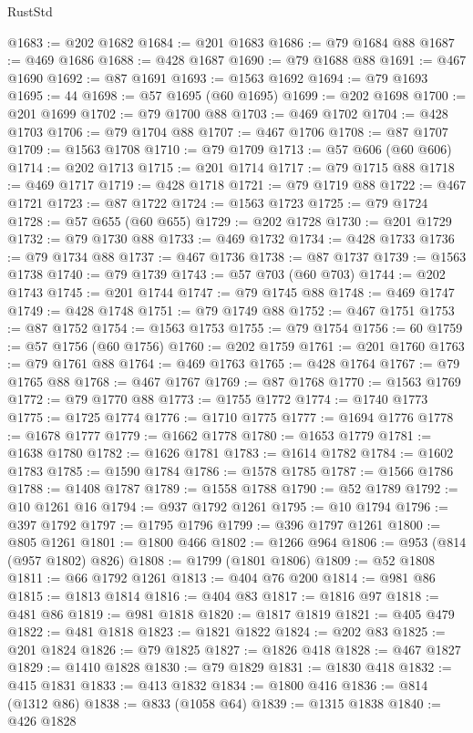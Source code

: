 \begin{lexlean}{RustStd}
\begin{coremodule}
@1683 := @202 @1682
@1684 := @201 @1683
@1686 := @79 @1684 @88
@1687 := @469 @1686
@1688 := @428 @1687
@1690 := @79 @1688 @88
@1691 := @467 @1690
@1692 := @87 @1691
@1693 := @1563 @1692
@1694 := @79 @1693
@1695 := 44
@1698 := @57 @1695 (@60 @1695)
@1699 := @202 @1698
@1700 := @201 @1699
@1702 := @79 @1700 @88
@1703 := @469 @1702
@1704 := @428 @1703
@1706 := @79 @1704 @88
@1707 := @467 @1706
@1708 := @87 @1707
@1709 := @1563 @1708
@1710 := @79 @1709
@1713 := @57 @606 (@60 @606)
@1714 := @202 @1713
@1715 := @201 @1714
@1717 := @79 @1715 @88
@1718 := @469 @1717
@1719 := @428 @1718
@1721 := @79 @1719 @88
@1722 := @467 @1721
@1723 := @87 @1722
@1724 := @1563 @1723
@1725 := @79 @1724
@1728 := @57 @655 (@60 @655)
@1729 := @202 @1728
@1730 := @201 @1729
@1732 := @79 @1730 @88
@1733 := @469 @1732
@1734 := @428 @1733
@1736 := @79 @1734 @88
@1737 := @467 @1736
@1738 := @87 @1737
@1739 := @1563 @1738
@1740 := @79 @1739
@1743 := @57 @703 (@60 @703)
@1744 := @202 @1743
@1745 := @201 @1744
@1747 := @79 @1745 @88
@1748 := @469 @1747
@1749 := @428 @1748
@1751 := @79 @1749 @88
@1752 := @467 @1751
@1753 := @87 @1752
@1754 := @1563 @1753
@1755 := @79 @1754
@1756 := 60
@1759 := @57 @1756 (@60 @1756)
@1760 := @202 @1759
@1761 := @201 @1760
@1763 := @79 @1761 @88
@1764 := @469 @1763
@1765 := @428 @1764
@1767 := @79 @1765 @88
@1768 := @467 @1767
@1769 := @87 @1768
@1770 := @1563 @1769
@1772 := @79 @1770 @88
@1773 := @1755 @1772
@1774 := @1740 @1773
@1775 := @1725 @1774
@1776 := @1710 @1775
@1777 := @1694 @1776
@1778 := @1678 @1777
@1779 := @1662 @1778
@1780 := @1653 @1779
@1781 := @1638 @1780
@1782 := @1626 @1781
@1783 := @1614 @1782
@1784 := @1602 @1783
@1785 := @1590 @1784
@1786 := @1578 @1785
@1787 := @1566 @1786
@1788 := @1408 @1787
@1789 := @1558 @1788
@1790 := @52 @1789
@1792 := @10 @1261 @16
@1794 := @937 @1792 @1261
@1795 := @10 @1794
@1796 := @397 @1792
@1797 := @1795 @1796
@1799 := @396 @1797 @1261
@1800 := @805 @1261
@1801 := @1800 @466
@1802 := @1266 @964
@1806 := @953 (@814 (@957 @1802) @826)
@1808 := @1799 (@1801 @1806)
@1809 := @52 @1808
@1811 := @66 @1792 @1261
@1813 := @404 @76 @200
@1814 := @981 @86
@1815 := @1813 @1814
@1816 := @404 @83
@1817 := @1816 @97
@1818 := @481 @86
@1819 := @981 @1818
@1820 := @1817 @1819
@1821 := @405 @479
@1822 := @481 @1818
@1823 := @1821 @1822
@1824 := @202 @83
@1825 := @201 @1824
@1826 := @79 @1825
@1827 := @1826 @418
@1828 := @467 @1827
@1829 := @1410 @1828
@1830 := @79 @1829
@1831 := @1830 @418
@1832 := @415 @1831
@1833 := @413 @1832
@1834 := @1800 @416
@1836 := @814 (@1312 @86)
@1838 := @833 (@1058 @64)
@1839 := @1315 @1838
@1840 := @426 @1828

\end{coremodule}
\end{lexlean}
